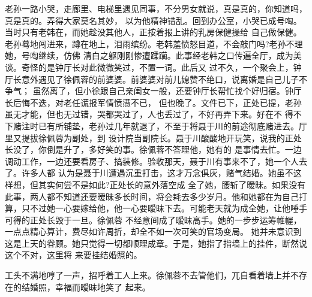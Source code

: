 \documentclass[11pt,a4paper,onecolumn]{article}
\begin{document}
老孙一路小哭，走廊里、电梯里遇见同事，不分男女就说，真是真的，你知道吗，真是真的。弄得大家莫名其妙，
以为他精神错乱。回到办公室，小哭已成号啕。当时只有老韩在，而她趁没其他人，正按着报上讲的乳房保健操给
自己做保健。老孙蓦地闯进来，蹲在地上，泪雨缤纷。老韩羞愤怒目道，不会敲门吗?老孙不理她，号啕继续，仿佛
清白之躯刚刚惨遭蹂躏。此事经老韩之口传遍全厅，成为美谈。奇怪的是钟厅长对此微微笑过，不置一词。此后又
过不久，一个聚会上，钟厅长意外遇见了徐佩蓉的前婆婆。前婆婆对前儿媳赞不绝口，说离婚是自己儿子不争气；
虽然离了，但小徐跟自己亲闺女一般，还要钟厅长帮忙找个好归宿。钟厅长后悔不迭，对老任谎报军情愤懑不已，
但也晚了。文件已下，正处已提，老孙虽无才能，但也无过错，哭都哭过了，人也丢过了，不好再弄下来。好在不
得不下赌注时已有所铺垫，老孙过几年就退了，不至于将聂于川的前途彻底赌进去。厅里又提拔徐佩蓉为副处，到
设计院当副院长。聂于川酸酸地开玩笑，说我的正处长没了，你倒是升了，多好笑的事。徐佩蓉不答理他，她有的
是事情去忙。一边调动工作，一边还要看房子、搞装修。验收那天，聂于川有事来不了，她一个人去了。许多人都
认为是聂于川遭遇沉重打击，这才万念俱灰，赌气结婚。她虽不这样想，但其实何尝不是如此?正处长的意外落空成
全了她，腰斩了暧昧。如果没有此事，两人都不知道还要暧昧多长时间，将会耗去多少岁月。他和她都在为自己打
算，只不过她一心要嫁给他，他一心要暧昧下去。可能老天就为成全她，让他唾手可得的正处长毁于一旦。徐佩蓉
不经意间成了暧昧高手。她的一步步运筹帷幄，一点点精心算计，费尽如许周折，却全不如一次可笑的官场变局。
她并未意识到这是上天的眷顾。她只觉得一切都顺理成章。于是，她指了指墙上的挂件，断然说这个不对，这里将
来要挂结婚照的。

工头不满地哼了一声，招呼着工人上来。徐佩蓉不去管他们，兀自看着墙上并不存在的结婚照，幸福而暧昧地笑了
起来。
\end{document}
